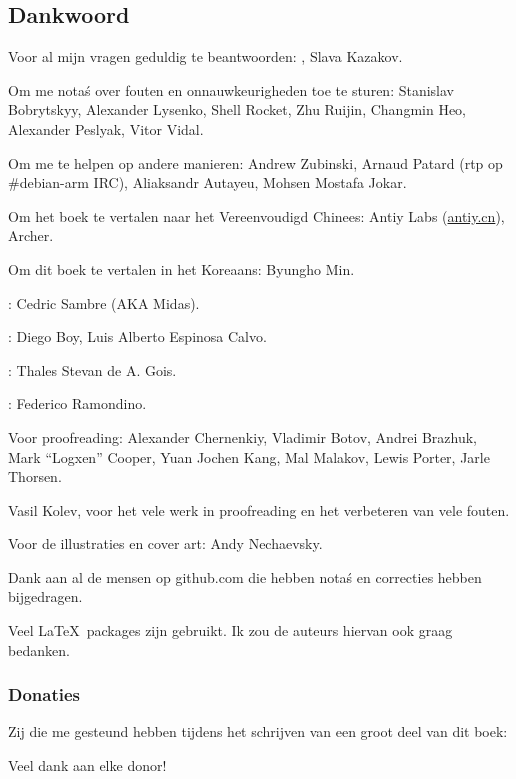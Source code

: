 \subsection*{Dankwoord}

Voor al mijn vragen geduldig te beantwoorden: \HERMIT, Slava  Kazakov.

Om me nota\'s over fouten en onnauwkeurigheden toe te sturen:
Stanislav  Bobrytskyy, Alexander Lysenko,
Shell Rocket, Zhu Ruijin, Changmin Heo, Alexander  Peslyak, Vitor Vidal.

Om me te helpen op andere manieren:
Andrew Zubinski,
Arnaud Patard (rtp op \#debian-arm IRC),
Aliaksandr Autayeu, Mohsen Mostafa Jokar.

Om het boek te vertalen naar het Vereenvoudigd Chinees:
Antiy Labs (\href{http://antiy.cn}{antiy.cn}), Archer.

Om dit boek te vertalen in het Koreaans: Byungho Min.

\NLph{}: Cedric Sambre (AKA Midas).

\NLph{}: Diego Boy, Luis Alberto Espinosa Calvo.

\NLph{}: Thales Stevan de A. Gois.

\NLph{}: Federico Ramondino.

Voor proofreading:
Alexander  Chernenkiy,
Vladimir Botov,
Andrei Brazhuk,
Mark ``Logxen'' Cooper, Yuan Jochen Kang, Mal Malakov, Lewis Porter, Jarle Thorsen.

Vasil Kolev, voor het vele werk in proofreading en het verbeteren van vele fouten.

Voor de illustraties en cover art: Andy Nechaevsky.

Dank aan al de mensen op github.com die hebben nota\'s en correcties hebben bijgedragen.

Veel \LaTeX\ packages zijn gebruikt. Ik zou de auteurs hiervan ook graag bedanken.

\subsubsection*{Donaties}

Zij die me gesteund hebben tijdens het schrijven van een groot deel van dit boek:



Veel dank aan elke donor!
